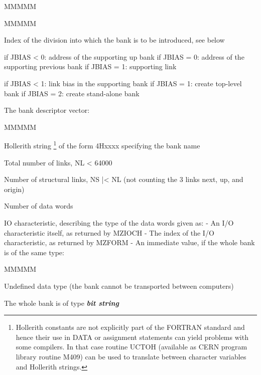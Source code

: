 \begin{DL}{MMMMM}
\item[Input:
]
\begin{DL}{MMMMM}
\item[IXDIV
]Index of the division into which the bank is
to be introduced, see below
\item[*LSUP*
]if JBIAS < 0:  address of the supporting up bank
\newline if JBIAS = 0:  address of the supporting previous bank
\newline if JBIAS = 1:  supporting link
\item[JBIAS
]if JBIAS < 1:  link bias in the supporting bank
\newline if JBIAS = 1:  create top-level bank
\newline if JBIAS = 2:  create stand-alone bank
\item[MMBK
]The bank descriptor vector:
\begin{DL}{MMMMM}
\item[MMBK(1) = IDH
]Hollerith string
\footnote{Hollerith
constants are not explicitly part of the FORTRAN standard and
hence their use in DATA or assignment statements can yield problems
with some compilers. In that case routine UCTOH
(available as CERN program library routine M409) can be used
to translate between character variables and Hollerith strings.
}
of the form 4Hxxxx specifying the bank name
\item[MMBK(2) = NL
]Total number of links, NL < 64000
\item[MMBK(3) = NS
]Number of structural links, NS |< NL
\newline (not counting the 3 links next, up, and origin)
\item[MMBK(4) = ND
]Number of data words
\item[MMBK(5) = NIO
]IO characteristic, describing the type of the data words given as:
\newline - An I/O characteristic itself, as returned by MZIOCH
\newline - The index of the I/O characteristic, as returned by MZFORM
\newline - An immediate value, if the whole bank is of the same type:
\begin{DL}{MMMMM}
\item[ 0
]Undefined data type (the bank cannot be transported between
computers)
\item[ 1
]The whole bank is of type {\bf\it bit string}

\end{DL}
\end{DL}
\end{DL}
\end{DL}
